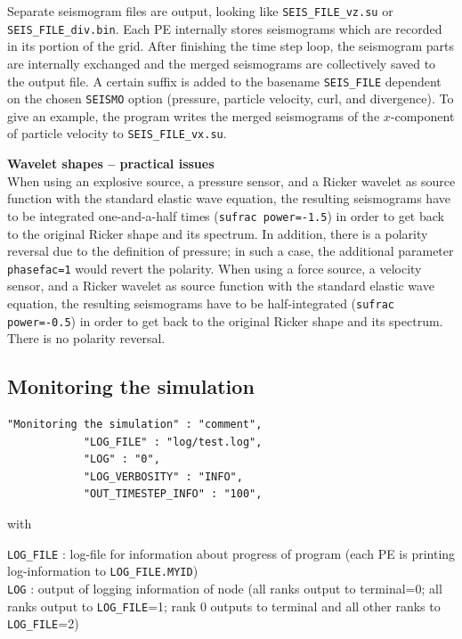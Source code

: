 Separate seismogram files are output, looking like \texttt{SEIS\_FILE\_vz.su} or \texttt{SEIS\_FILE\_div.bin}. Each PE internally stores seismograms which are recorded in its portion of the grid. After finishing the time step loop, the seismogram parts are internally exchanged and the merged seismograms are collectively saved to the output file. A certain suffix is added to the basename \texttt{SEIS\_FILE} dependent on the chosen \texttt{SEISMO} option (pressure, particle velocity, curl, and divergence). To give an example, the program writes the merged seismograms of the $x$-component of particle velocity to \texttt{SEIS\_FILE\_vx.su}.

\textbf{Wavelet shapes -- practical issues}\\
When using an explosive source, a pressure sensor, and a Ricker wavelet as source function with the standard elastic wave equation, the resulting seismograms have to be integrated one-and-a-half times (\texttt{sufrac power=-1.5}) in order to get back to the original Ricker shape and its spectrum. In addition, there is a polarity reversal due to the definition of pressure; in such a case, the additional parameter \texttt{phasefac=1} would revert the polarity. When using a force source, a velocity sensor, and a Ricker wavelet as source function with the standard elastic wave equation, the resulting seismograms have to be half-integrated (\texttt{sufrac power=-0.5}) in order to get back to the original Ricker shape and its spectrum. There is no polarity reversal.

\subsection{Monitoring the simulation}
\begin{verbatim}
"Monitoring the simulation" : "comment",
            "LOG_FILE" : "log/test.log",
            "LOG" : "0",
            "LOG_VERBOSITY" : "INFO",
            "OUT_TIMESTEP_INFO" : "100",
\end{verbatim}

with

\texttt{LOG\_FILE} : log-file for information about progress of program (each PE is printing log-information to \texttt{LOG\_FILE.MYID})\\
\texttt{LOG} : output of logging information of node (all ranks output to terminal=0; all ranks output to \texttt{LOG\_FILE}=1; rank 0 outputs to terminal and all other ranks to \texttt{LOG\_FILE}=2)

